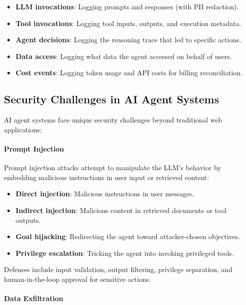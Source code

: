 \begin{itemize}
    \item \textbf{LLM invocations}: Logging prompts and responses (with PII redaction).
    \item \textbf{Tool invocations}: Logging tool inputs, outputs, and execution metadata.
    \item \textbf{Agent decisions}: Logging the reasoning trace that led to specific actions.
    \item \textbf{Data access}: Logging what data the agent accessed on behalf of users.
    \item \textbf{Cost events}: Logging token usage and API costs for billing reconciliation.
\end{itemize}

\subsection{Security Challenges in AI Agent Systems}

AI agent systems face unique security challenges beyond traditional web applications:

\paragraph{Prompt Injection}

Prompt injection attacks attempt to manipulate the LLM's behavior by embedding malicious instructions in user input or retrieved content:

\begin{itemize}
    \item \textbf{Direct injection}: Malicious instructions in user messages.
    \item \textbf{Indirect injection}: Malicious content in retrieved documents or tool outputs.
    \item \textbf{Goal hijacking}: Redirecting the agent toward attacker-chosen objectives.
    \item \textbf{Privilege escalation}: Tricking the agent into invoking privileged tools.
\end{itemize}

Defenses include input validation, output filtering, privilege separation, and human-in-the-loop approval for sensitive actions.

\paragraph{Data Exfiltration}

